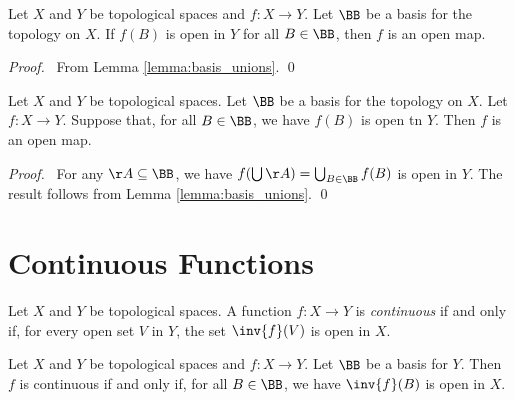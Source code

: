 \begin{lemma}
    \label{lemma:open_map_basis}
    Let $X$ and $Y$ be topological spaces and $f : X \rightarrow Y$. Let $\BB$ be a basis for the topology on $X$.
    If $f(B)$ is open in $Y$ for all $B \in \BB$, then $f$ is an open map.
\end{lemma}

\begin{proof}
    \pf\ From Lemma \ref{lemma:basis_unions}. \qed
\end{proof}

\begin{proposition}
    \label{proposition:open_map_basis}
    Let $X$ and $Y$ be topological spaces. Let $\BB$ be a basis for the topology on $X$.
    Let $f : X \rightarrow Y$. Suppose that, for all $B \in \BB$, we have $f(B)$
    is open tn $Y$. Then $f$ is an open map.
\end{proposition}

\begin{proof}
    \pf\ For any $\AA \subseteq \BB$, we have $f(\bigcup \AA) = \bigcup_{B \in \BB} f(B)$
    is open in $Y$. The result follows from Lemma \ref{lemma:basis_unions}. \qed
\end{proof}

\section{Continuous Functions}

\begin{definition}[Continuous]
    Let $X$ and $Y$ be topological spaces. A function $f : X \rightarrow Y$ is \emph{continuous} if and only
    if, for every open set $V$ in $Y$, the set $\inv{f}(V)$ is open in $X$.
\end{definition}

\begin{proposition}
    \label{proposition:continuous_basis}
    Let $X$ and $Y$ be topological spaces and $f : X \rightarrow Y$. Let $\BB$ be a basis for $Y$. Then $f$
    is continuous if and only if, for all $B \in \BB$, we have $\inv{f}(B)$ is open in $X$.
\end{proposition}

